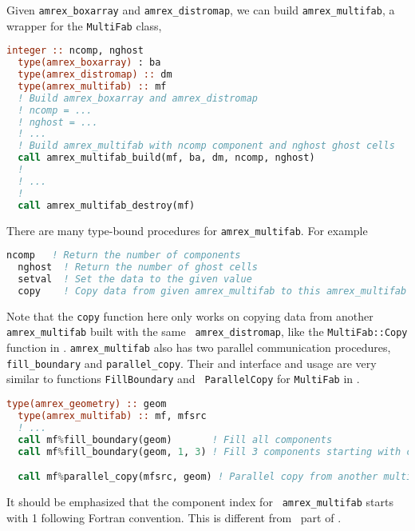 {Given {\tt amrex\_boxarray} and {\tt amrex\_distromap}, we can build
{\tt amrex\_multifab}, a wrapper for the {\tt MultiFab} class,
\begin{lstlisting}[language=fortran]
  integer :: ncomp, nghost
  type(amrex_boxarray) : ba
  type(amrex_distromap) :: dm
  type(amrex_multifab) :: mf
  ! Build amrex_boxarray and amrex_distromap
  ! ncomp = ...
  ! nghost = ...
  ! ...
  ! Build amrex_multifab with ncomp component and nghost ghost cells
  call amrex_multifab_build(mf, ba, dm, ncomp, nghost)
  !
  ! ...
  !
  call amrex_multifab_destroy(mf)
\end{lstlisting}
There are many type-bound procedures for {\tt amrex\_multifab}.  For
example
\begin{lstlisting}[language=fortran]
  ncomp   ! Return the number of components
  nghost  ! Return the number of ghost cells
  setval  ! Set the data to the given value 
  copy    ! Copy data from given amrex_multifab to this amrex_multifab
\end{lstlisting}
Note that the {\tt copy} function here only works on copying data from
another {\tt amrex\_multifab} built with the same {\tt
  amrex\_distromap}, like the {\tt MultiFab::Copy} function in \cpp.
{\tt amrex\_multifab} also has two parallel communication procedures,
{\tt fill\_boundary} and {\tt parallel\_copy}.  Their and interface
and usage are very similar to functions {\tt FillBoundary} and {\tt
  ParallelCopy} for {\tt MultiFab} in \cpp.
\begin{lstlisting}[language=fortran]
  type(amrex_geometry) :: geom
  type(amrex_multifab) :: mf, mfsrc
  ! ...
  call mf%fill_boundary(geom)       ! Fill all components
  call mf%fill_boundary(geom, 1, 3) ! Fill 3 components starting with component 1

  call mf%parallel_copy(mfsrc, geom) ! Parallel copy from another multifab
\end{lstlisting}
It should be emphasized that the component index for {\tt
  amrex\_multifab} starts with 1 following Fortran convention.  This
is different from \cpp\ part of \amrex.

}

